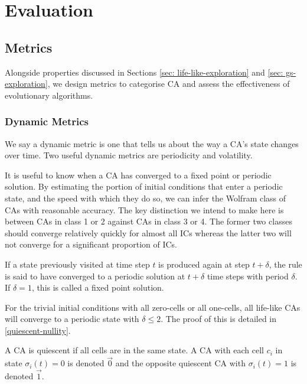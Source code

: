 \chapter{Evaluation} \label{evaluation}

\section{Metrics}
Alongside properties discussed in Sections \ref{sec: life-like-exploration} and \ref{sec: gs-exploration}, we design metrics to categorise CA and assess the effectiveness of evolutionary algorithms.

\subsection{Dynamic Metrics}
We say a dynamic metric is one that tells us about the way a CA's state changes over time. Two useful dynamic metrics are periodicity and volatility.

It is useful to know when a CA has converged to a fixed point or periodic solution. By estimating the portion of initial conditions that enter a periodic state, and the speed with which they do so, we can infer the Wolfram class of CAs with reasonable accuracy. The key distinction we intend to make here is between CAs in class 1 or 2 against CAs in class 3 or 4. The former two classes should converge relatively quickly for almost all ICs whereas the latter two will not converge for a significant proportion of ICs.

\begin{definition}
 If a state previously visited at time step $t$ is produced again at step $t+\delta$, the rule is said to have converged to a periodic solution at $t+\delta$ time steps with period $\delta$. If $\delta = 1$, this is called a fixed point solution. 
\end{definition}

For the trivial initial conditions with all zero-cells or all one-cells, all life-like CAs will converge to a periodic state with $\delta \leq 2$. The proof of this is detailed in \ref{quiescent-nullity}.

\begin{definition}[Quiescence]
A CA is quiescent if all cells are in the same state. A CA with each cell $c_i$ in state $\sigma_i(t) = 0$ is denoted $\vec{0}$ and the opposite quiescent CA with $\sigma_i(t) = 1$ is denoted $\vec{1}$. 
\end{definition}


